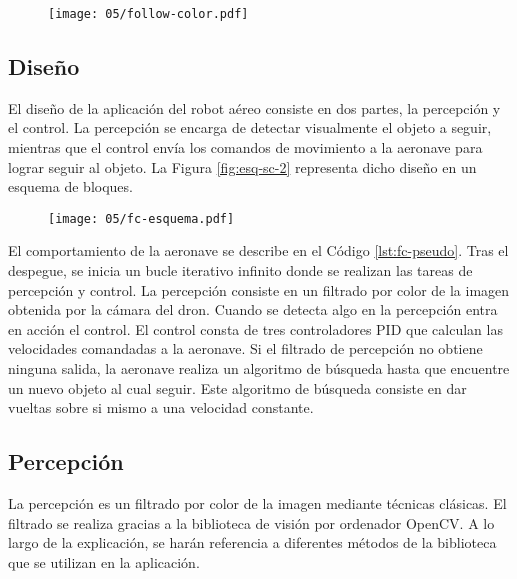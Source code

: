 \documentclass[../main.tex]{subfiles}
\begin{document}
\begin{figure}[!ht]
 	{\texttt{[image: 05/follow-color.pdf]}}
\end{figure}

\subsection*{Diseño}
El diseño de la aplicación del robot aéreo consiste en dos partes, la percepción y el control. La percepción se encarga de detectar visualmente el objeto a seguir, mientras que el control envía los comandos de movimiento a la aeronave para lograr seguir al objeto. La Figura \ref{fig:esq-sc-2} representa dicho diseño en un esquema de bloques.

\begin{figure}[!ht]
 	{\texttt{[image: 05/fc-esquema.pdf]}}
\end{figure}

El comportamiento de la aeronave se describe en el Código \ref{lst:fc-pseudo}. Tras el despegue, se inicia un bucle iterativo infinito donde se realizan las tareas de percepción y control. La percepción consiste en un filtrado por color de la imagen obtenida por la cámara del dron. Cuando se detecta algo en la percepción entra en acción el control. El control consta de tres controladores PID que calculan las velocidades comandadas a la aeronave. Si el filtrado de percepción no obtiene ninguna salida, la aeronave realiza un algoritmo de búsqueda hasta que encuentre un nuevo objeto al cual seguir. Este algoritmo de búsqueda consiste en dar vueltas sobre si mismo a una velocidad constante.



\subsection*{Percepción}
La percepción es un filtrado por color de la imagen mediante técnicas clásicas. El filtrado se realiza gracias a la biblioteca de visión por ordenador OpenCV. A lo largo de la explicación, se harán referencia a diferentes métodos de la biblioteca que se utilizan en la aplicación.
\end{document}
